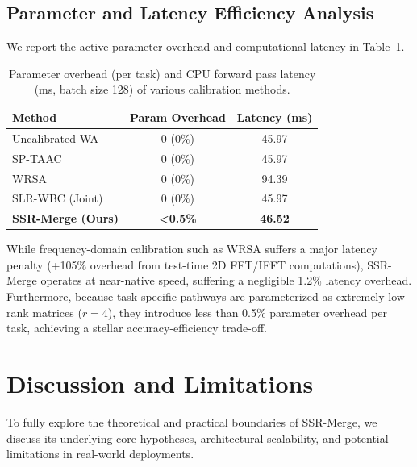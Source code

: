 \documentclass{article}
\theoremstyle{plain}
\theoremstyle{definition}
\theoremstyle{remark}
\begin{document}
\subsection{Parameter and Latency Efficiency Analysis}
We report the active parameter overhead and computational latency in Table~\ref{tab:latency_efficiency}.

\begin{table}[h]
\caption{Parameter overhead (per task) and CPU forward pass latency (ms, batch size 128) of various calibration methods.}
\label{tab:latency_efficiency}
\vskip 0.15in
\begin{center}
\begin{small}
\begin{tabular}{lcc}
\toprule
Method & Param Overhead & Latency (ms) \\
\midrule
Uncalibrated WA & 0 (0\%) & 45.97 \\
SP-TAAC & 0 (0\%) & 45.97 \\
WRSA & 0 (0\%) & 94.39 \\
SLR-WBC (Joint) & 0 (0\%) & 45.97 \\
\textbf{SSR-Merge (Ours)} & \textbf{<0.5\%} & \textbf{46.52} \\
\bottomrule
\end{tabular}
\end{small}
\end{center}
\vskip -0.1in
\end{table}

While frequency-domain calibration such as WRSA suffers a major latency penalty (+105\% overhead from test-time 2D FFT/IFFT computations), SSR-Merge operates at near-native speed, suffering a negligible 1.2\% latency overhead. Furthermore, because task-specific pathways are parameterized as extremely low-rank matrices ($r = 4$), they introduce less than 0.5\% parameter overhead per task, achieving a stellar accuracy-efficiency trade-off.

\section{Discussion and Limitations}
\label{submission:discussion}

To fully explore the theoretical and practical boundaries of SSR-Merge, we discuss its underlying core hypotheses, architectural scalability, and potential limitations in real-world deployments.
\end{document}
